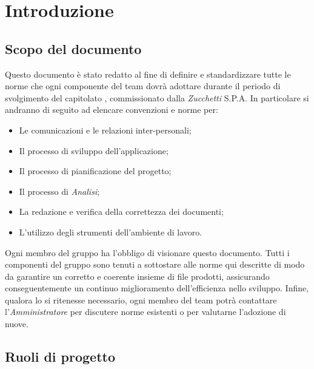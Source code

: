 \section{Introduzione}

\subsection{Scopo del documento}
Questo documento è stato redatto al fine di definire e standardizzare tutte le norme che ogni componente del team \gruppo{} dovrà adottare durante il periodo di svolgimento del capitolato \progetto, commissionato dalla \textit{Zucchetti} S.P.A. In particolare si andranno di seguito ad elencare convenzioni e norme per:
\begin{itemize}
\item Le comunicazioni e le relazioni inter-personali;
\item Il processo di sviluppo dell'applicazione;
\item Il processo di pianificazione del progetto;
\item Il processo di \textit{Analisi};
\item La redazione e verifica della correttezza dei documenti;
\item L'utilizzo degli strumenti dell'ambiente di lavoro.
\end{itemize}

Ogni membro del gruppo \gruppo{} ha l'obbligo di visionare questo documento.
Tutti i componenti del gruppo sono tenuti a sottostare alle norme qui descritte di modo da garantire un corretto e coerente insieme di file prodotti, assicurando conseguentemente un continuo miglioramento dell'efficienza nello sviluppo.
Infine, qualora lo si ritenesse necessario, ogni membro del team potrà contattare l'\textit{Amministratore} per discutere norme esistenti o per valutarne l'adozione di nuove.
\subsection{Ruoli di progetto}

